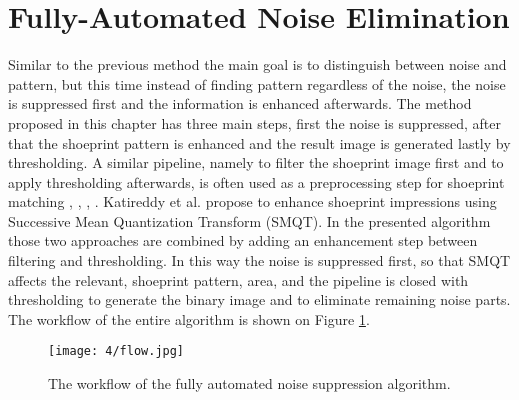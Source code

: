 \documentclass[draft,final]{vutinfth} %
\begin{document}
\section{Fully-Automated Noise Elimination}

\par
Similar to the previous method the main goal is to distinguish between noise and pattern, but this time instead of finding pattern regardless of the noise, the noise is suppressed first and the information is enhanced afterwards.
The method proposed in this chapter has three main steps, first the noise is suppressed, after that the shoeprint pattern is enhanced and the result image is generated lastly by thresholding.
A similar pipeline, namely to filter the shoeprint image first and to apply thresholding afterwards, is  often used as a preprocessing step for shoeprint matching \cite{alizadeh2017automatic}, \cite{wang2014automatic}, \cite{li2014retrieval}, \cite{kong2014novel}.
Katireddy et al. \cite{katireddy2017novel} propose to enhance shoeprint impressions using Successive Mean Quantization Transform (SMQT).
In the presented algorithm those two approaches are combined by adding an enhancement step between filtering and thresholding.
In this way the noise is suppressed first, so that SMQT affects the relevant, shoeprint pattern, area, and the pipeline is closed with thresholding to generate the binary image and to eliminate remaining noise parts.
The workflow of the entire algorithm is shown on Figure \ref{fig:fans:workflow}.

\begin{figure}[h]
  \centering
  \texttt{[image: 4/flow.jpg]}
  \caption{The workflow of the fully automated noise suppression algorithm.}
  \label{fig:fans:workflow} %
\end{figure}
\end{document}

